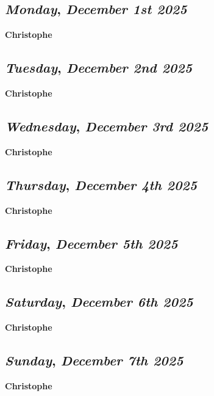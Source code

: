 \begin{center}
\section*{\month}
\end{center}

\def\day{\textit{December 1st 2025}}
\def\weekday{\textit{Monday}}
\subsection*{\weekday, \day}
\textbf {Christophe}

\def\day{\textit{December 2nd 2025}}
\def\weekday{\textit{Tuesday}}
\subsection*{\weekday, \day}
\textbf {Christophe}

\def\day{\textit{December 3rd 2025}}
\def\weekday{\textit{Wednesday}}
\subsection*{\weekday, \day}
\textbf {Christophe}

\def\day{\textit{December 4th 2025}}
\def\weekday{\textit{Thursday}}
\subsection*{\weekday, \day}
\textbf {Christophe}

\def\day{\textit{December 5th 2025}}
\def\weekday{\textit{Friday}}
\subsection*{\weekday, \day}
\textbf {Christophe}

\def\day{\textit{December 6th 2025}}
\def\weekday{\textit{Saturday}}
\subsection*{\weekday, \day}
\textbf {Christophe}

\def\day{\textit{December 7th 2025}}
\def\weekday{\textit{Sunday}}
\subsection*{\weekday, \day}
\textbf {Christophe}

\def\day{\textit{December 8th 2025}}
\def\weekday{\textit{Monday}}
